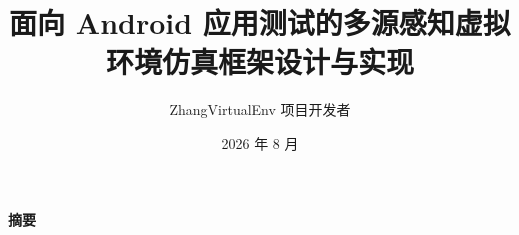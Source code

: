 \documentclass[UTF8,a4paper,11pt]{ctexart}
\title{面向 Android 应用测试的多源感知虚拟环境仿真框架设计与实现}
\author{ZhangVirtualEnv 项目开发者}
\date{2026 年 8 月}
\begin{document}
\maketitle
\thispagestyle{plain}
\begin{center}
  {\bfseries 摘要}
\end{center}

\clearpage

\tableofcontents
\clearpage








\clearpage


\end{document}

